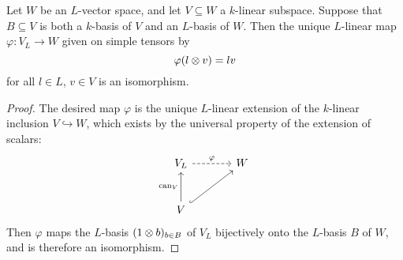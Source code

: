 \begin{corollary}
\label{corollary: inclusion to bijection vector spaces}
  Let $W$ be an $L$-vector space, and let $V \subseteq W$ a $k$-linear subspace.
  Suppose that $B \subseteq V$ is both a $k$-basis of $V$ and an $L$-basis of $W$.
  Then the unique $L$-linear map $\varphi \colon V_L \to W$ given on simple tensors by
  \[
      \varphi(l \mathbin{\otimes} v)
    = l v
  \]
  for all $l \in L$, $v \in V$ is an isomorphism.
\end{corollary}


\begin{proof}
  The desired map $\varphi$ is the unique $L$-linear extension of the $k$-linear inclusion $V \hookrightarrow W$, which exists by the universal property of the extension of scalars:
  \[
    \begin{tikzcd}[sep = large]
        V_L
        \arrow[dashed]{r}[above]{\varphi}
      & W
      \\
        V
        \arrow{u}[left]{\can_V}
        \arrow[hookrightarrow]{ru}
      & {}
    \end{tikzcd}
  \]
  Then $\varphi$ maps the $L$-basis $(1 \mathbin{\otimes} b)_{b \in B}$ of $V_L$ bijectively onto the $L$-basis $B$ of $W$, and is therefore an isomorphism.
\end{proof}


